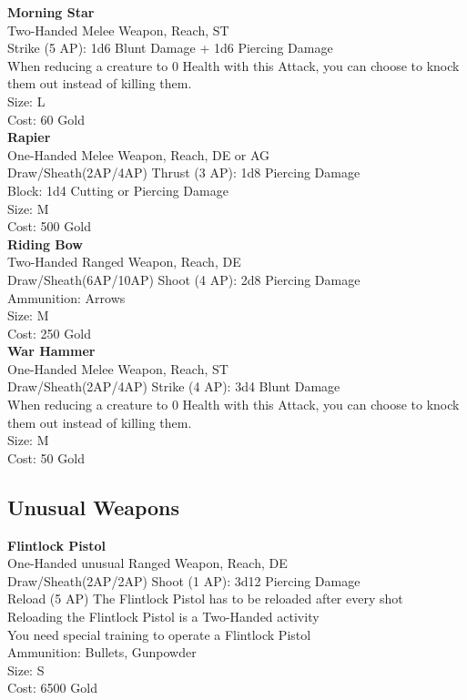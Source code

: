 \textbf{Morning Star}\label{weapon:morningStar}\\
Two-Handed Melee Weapon,  Reach, ST\\
Strike (5 AP): 1d6 Blunt Damage + 1d6 Piercing Damage\\
When reducing a creature to 0 Health with this Attack, you can choose to knock them out instead of killing them.\\
Size: L\\
Cost: 60 Gold\\

\textbf{Rapier}\label{weapon:rapier}\\
One-Handed Melee Weapon,  Reach, DE or AG\\
Draw/Sheath(2AP/4AP)
Thrust (3 AP): 1d8 Piercing Damage\\
Block: 1d4 Cutting or Piercing Damage\\
Size: M\\
Cost: 500 Gold\\

\textbf{Riding Bow}\label{weapon:ridingBow}\\
Two-Handed Ranged Weapon,  Reach, DE\\
Draw/Sheath(6AP/10AP)
Shoot (4 AP): 2d8 Piercing Damage\\
Ammunition: Arrows\\
Size: M\\
Cost: 250 Gold\\

\textbf{War Hammer}\label{weapon:warHammer}\\
One-Handed Melee Weapon,  Reach, ST\\
Draw/Sheath(2AP/4AP)
Strike (4 AP): 3d4 Blunt Damage\\
When reducing a creature to 0 Health with this Attack, you can choose to knock them out instead of killing them.\\
Size: M\\
Cost: 50 Gold\\

\subsection{Unusual Weapons}\label{subsec:unusualWeapons}
\textbf{Flintlock Pistol}\label{weapon:flintlockPistol}\\
One-Handed unusual Ranged Weapon,  Reach, DE\\
Draw/Sheath(2AP/2AP)
Shoot (1 AP): 3d12 Piercing Damage\\
Reload (5 AP) The Flintlock Pistol has to be reloaded after every shot\\
Reloading the Flintlock Pistol is a Two-Handed activity\\
You need special training to operate a Flintlock Pistol\\
Ammunition: Bullets, Gunpowder\\
Size: S\\
Cost: 6500 Gold\\

